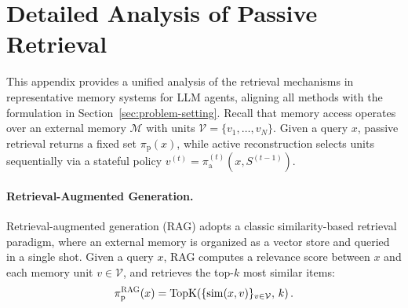 \documentclass{llmxive}
\begin{document}

\nocite{langley00}




\appendix



\section{Detailed Analysis of Passive Retrieval}
\label{app:retrieval-analysis}

This appendix provides a unified analysis of the retrieval mechanisms in representative memory systems for LLM agents, aligning all methods with the formulation in Section~\ref{sec:problem-setting}. Recall that memory access operates over an external memory $\mathcal{M}$ with units $\mathcal{V}=\{v_1,\ldots,v_N\}$. Given a query $x$, passive retrieval returns a fixed set $\pi_{\mathrm p}(x)$, while active reconstruction selects units sequentially via a stateful policy $v^{(t)}=\pi_{\mathrm a}^{(t)}(x,S^{(t-1)})$.

\label{app:analysis-existing}


\paragraph{Retrieval-Augmented Generation.}
Retrieval-augmented generation (RAG) adopts a classic similarity-based retrieval paradigm, where an external memory is organized as a vector store and queried in a single shot. Given a query $x$, RAG computes a relevance score between $x$ and each memory unit $v\in\mathcal{V}$, and retrieves the top-$k$ most similar items:
\begin{equation}
\pi_{\mathrm p}^{\textsc{RAG}}(x)
=
\mathrm{TopK}\!\left(\{\mathrm{sim}(x,v)\}_{v\in\mathcal{V}},\,k\right).
\end{equation}
\end{document}
